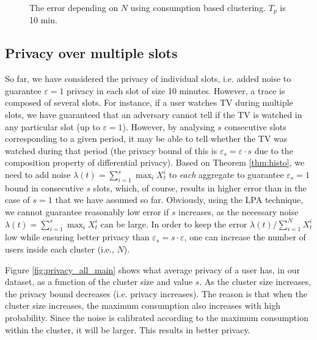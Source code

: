 \documentclass[11pt,a4paper]{article}
\theoremstyle{plain}
\theoremstyle{plain}
\theoremstyle{plain}
\theoremstyle{plain}
\theoremstyle{nonumberplain} \theoremseparator{}
\begin{document}
\begin{figure*}[ht]
\centering
{}
\caption{The error depending on $N$ using consumption based clustering. $T_{p}$ is 10 min. \label{fig:cons_cluster_main} 
}
\end{figure*}



\subsection{Privacy over multiple slots}
So far, we have considered the privacy of individual slots, i.e. added noise to guarantee $\varepsilon=1$ privacy in each slot of size 10 minutes. However, a trace
is composed of several slots. For instance, if a user watches TV during multiple slots, we have guaranteed that an adversary cannot tell if the TV is watched in any particular slot (up to $\varepsilon=1$). However, by analysing $s$ consecutive slots corresponding to a given period,  it may be able to tell whether the TV was watched during that period (the privacy bound of this is $\varepsilon_s = \varepsilon \cdot s$ due to the composition property of differential privacy).   
Based on Theorem \ref{thm:histo}, we need to add noise $\lambda(t) = \sum_{i=1}^{s} \max_{i} X_{t}^{i}$ to \emph{each} aggregate to guarantee $\varepsilon_s=1$ bound in consecutive $s$ slots, which, of course, results in higher error than in the case of $s=1$ that we have assumed so far. Obviously, using the LPA technique, we cannot guarantee reasonably low error if $s$ increases, as the necessary noise $\lambda(t) = \sum_{i=1}^{s} \max_{i} X_{t}^{i}$ can be large. In order to keep the error $\lambda(t)/\sum_{i=1}^N X_{t}^i$ low while ensuring better privacy than $\varepsilon_s = s \cdot \varepsilon$, one can increase the number of users inside each cluster (i.e., $N$).

Figure \ref{fig:privacy_all_main} shows what average privacy of a user has, in our dataset, as a function of 
 the cluster size and value  $s$. 
As the cluster size increases, the privacy bound decreases (i.e. privacy increases). The reason is that when the cluster
size increases, the maximum consumption also increases with high probability. Since the noise is calibrated according to 
the maximum consumption within the cluster, it will be larger. This results in better privacy.
\end{document}
